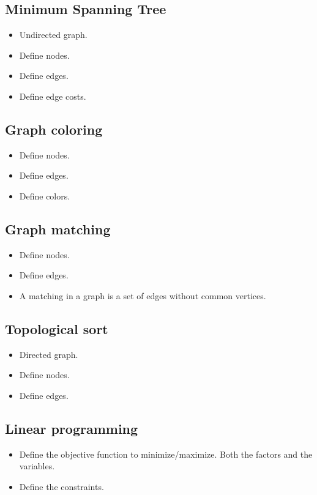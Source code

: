 \documentclass[guide.tex]{subfiles}
\begin{document}
\subsection{Minimum Spanning Tree}
\begin{itemize}
  \item Undirected graph.
  \item Define nodes.
  \item Define edges.
  \item Define edge costs.
\end{itemize}

\subsection{Graph coloring}
\begin{itemize}
  \item Define nodes.
  \item Define edges.
  \item Define colors.
\end{itemize}

\subsection{Graph matching}
\begin{itemize}
  \item Define nodes.
  \item Define edges.
  \item A matching in a graph is a set of edges without common vertices.
\end{itemize}

\subsection{Topological sort}
\begin{itemize}
  \item Directed graph.
  \item Define nodes.
  \item Define edges.
\end{itemize}

\subsection{Linear programming}
\begin{itemize}
  \item Define the objective function to minimize/maximize. Both the factors and the variables.
  \item Define the constraints.
\end{itemize}
\end{document}
